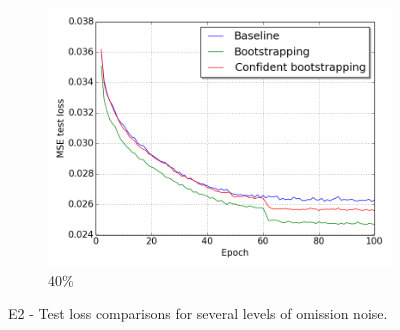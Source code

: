 \begin{figure}[H]
\begin{subfigure}{0.31\textwidth}
\end{subfigure}
\hspace*{\fill} %
\begin{subfigure}{0.31\textwidth}
\includegraphics[width=\textwidth]{figs/E2/lc_4.png}
\caption{40\%} \label{fig:app_E2_4_lc}
\vspace{-0.1cm} %
\end{subfigure}
\vspace{-0.6\baselineskip}
\caption{E2 - Test loss comparisons for several levels of omission noise.} \label{fig:E2_all_lc}
\end{figure}


